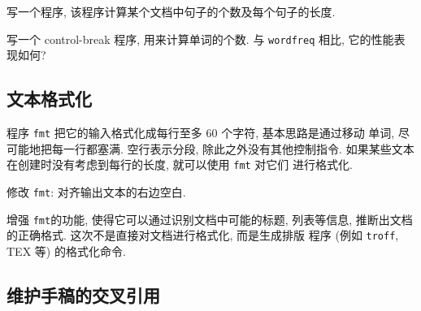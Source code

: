 \begin{exercise}
    写一个程序, 该程序计算某个文档中句子的个数及每个句子的长度.
\end{exercise}

\begin{exercise}
    写一个 control-break 程序, 用来计算单词的个数. 与 \texttt{wordfreq} 
    相比, 它的性能表现如何?
\end{exercise}

\subsection{文本格式化}
\label{subsec:text_formatting}

程序 \texttt{fmt} 把它的输入格式化成每行至多 60 个字符, 基本思路是通过移动
单词, 尽可能地把每一行都塞满. 空行表示分段, 除此之外没有其他控制指令.
如果某些文本在创建时没有考虑到每行的长度, 就可以使用 \texttt{fmt} 对它们
进行格式化.

\begin{exercise}
    \label{exer:fmt_justify}
    修改 \texttt{fmt}: 对齐输出文本的右边空白.
\end{exercise}

\begin{exercise}
    增强 \texttt{fmt}的功能, 使得它可以通过识别文档中可能的标题, 列表等信息,
    推断出文档的正确格式. 这次不是直接对文档进行格式化, 而是生成排版
    程序 (例如 \texttt{troff}, TEX 等) 的格式化命令.
\end{exercise}

\subsection{维护手稿的交叉引用}
\label{subsec:maintaining_cross_reference_in_manuscripts}

